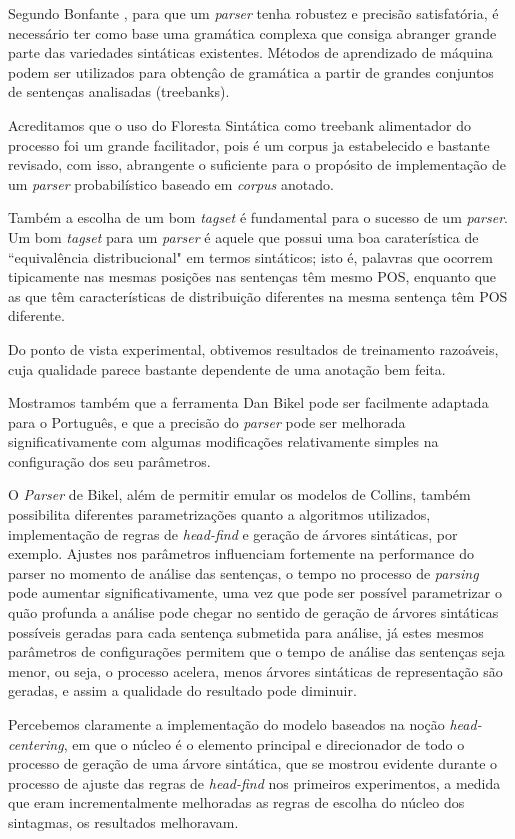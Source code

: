Segundo Bonfante \cite{bonfante03}, para que um \emph{parser} tenha robustez e precisão satisfatória, é necessário ter como base uma gramática complexa que consiga abranger grande parte das variedades sintáticas existentes. Métodos de aprendizado de máquina podem ser utilizados para obtençâo de gramática a partir de grandes conjuntos de sentenças analisadas (treebanks). 

Acreditamos que o uso do Floresta Sintática como treebank alimentador do processo foi um grande facilitador, pois é um corpus ja estabelecido e bastante revisado, com isso, abrangente o suficiente para o propósito de implementação de um \emph{parser} probabilístico baseado em \emph{corpus} anotado.

Também a escolha de um bom \emph{tagset} é fundamental para o sucesso de um \emph{parser}. Um bom \emph{tagset} para um \emph{parser} é aquele que possui uma boa caraterística de ``equivalência distribucional" em termos sintáticos; isto é, palavras que ocorrem tipicamente nas mesmas posições nas sentenças têm mesmo POS, enquanto que as que têm características de distribuição diferentes na mesma sentença têm POS diferente. 

Do ponto de vista experimental, obtivemos resultados de treinamento razoáveis, cuja qualidade parece bastante dependente de uma anotação bem feita. 

Mostramos também que a ferramenta Dan Bikel pode ser facilmente adaptada para o Português, e que a precisão do \emph{parser}
pode ser melhorada significativamente com algumas modificações relativamente simples na configuração dos seu parâmetros.

O \emph{Parser} de Bikel, além de permitir emular os modelos de Collins, também possibilita diferentes parametrizações quanto a algoritmos utilizados, implementação de regras de \emph{head-find} e geração de árvores sintáticas, por exemplo. Ajustes nos parâmetros influenciam fortemente na performance do parser no momento de análise das sentenças, o tempo no processo de \emph{parsing} pode aumentar significativamente, uma vez que pode ser possível parametrizar o quão profunda a análise pode chegar no sentido de geração de árvores sintáticas possíveis geradas para cada sentença submetida para análise, já estes mesmos parâmetros de configurações permitem que o tempo de análise das sentenças seja menor, ou seja, o processo acelera, menos árvores sintáticas de representação são geradas, e assim a qualidade do resultado pode diminuir.

Percebemos claramente a implementação do modelo baseados na noção \emph{head-centering}, em que o núcleo é o elemento principal e direcionador de todo o processo de geração de uma árvore sintática, que se mostrou evidente durante o processo de ajuste das regras de \emph{head-find} nos primeiros experimentos, a medida que eram incrementalmente melhoradas as regras de escolha do núcleo dos sintagmas, os resultados melhoravam.

